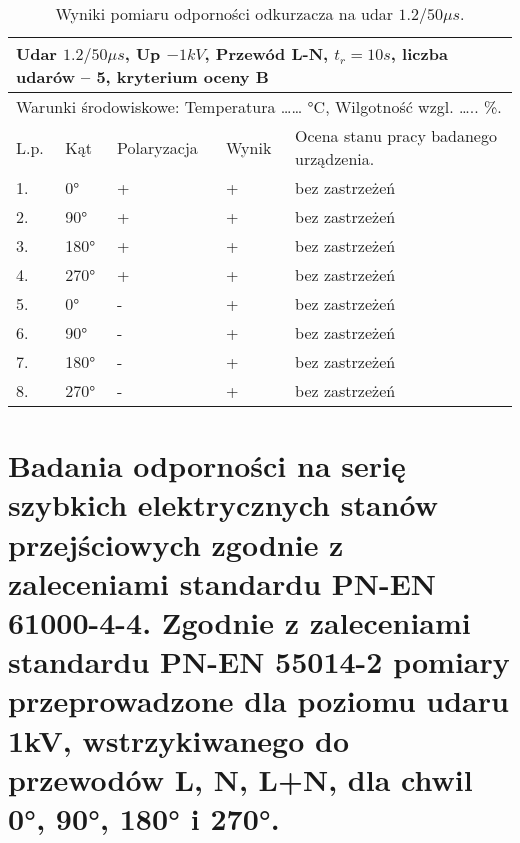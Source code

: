 \documentclass{classrep}
\begin{document}
\begin{table}[H]
	\centering
	\caption{Wyniki pomiaru odporności odkurzacza na udar $1.2/50 \mu s$.}
	\label{tab:1}
	\begin{tabular}{|l|l|l|l|l|}
		\hline
		\multicolumn{5}{|l|}{Udar $ 1.2/50 \mu s$, Up $-1kV$, Przewód L-N, $t_r =10s$, liczba udarów – 5, kryterium oceny B} \\ \hline
		\multicolumn{5}{|l|}{Warunki środowiskowe: Temperatura …… °C, Wilgotność wzgl. ….. \%.}                         \\ \hline
		L.p.         & Kąt          & Polaryzacja        & Wynik        & Ocena stanu pracy badanego urządzenia.        \\ \hline
		1.           & 0°           & +                  & +            & bez zastrzeżeń                                \\ \hline
		2.           & 90°          & +                  & +            & bez zastrzeżeń                                \\ \hline
		3.           & 180°         & +                  & +            & bez zastrzeżeń                                \\ \hline
		4.           & 270°         & +                  & +            & bez zastrzeżeń                                \\ \hline
		5.           & 0°           & -                  & +            & bez zastrzeżeń                                \\ \hline
		6.           & 90°          & -                  & +            & bez zastrzeżeń                                \\ \hline
		7.           & 180°         & -                  & +            & bez zastrzeżeń                                \\ \hline
		8.           & 270°         & -                  & +            & bez zastrzeżeń                                \\ \hline
		\end{tabular}
\end{table}
		

\section{Badania odporności na serię szybkich elektrycznych stanów przejściowych zgodnie z zaleceniami standardu PN-EN 61000-4-4. Zgodnie z zaleceniami standardu PN-EN 55014-2 pomiary przeprowadzone dla poziomu udaru 1kV, wstrzykiwanego do przewodów L, N, L+N, dla  chwil 0°, 90°, 180° i 270°.}
\end{document}
